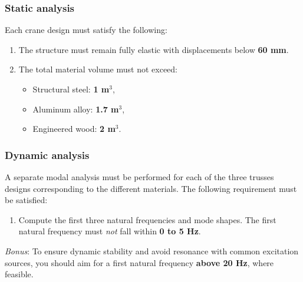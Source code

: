 \documentclass[12pt]{article}
\begin{document}
\subsubsection*{Static analysis}
Each crane design must satisfy the following:

\begin{enumerate}
  \item The structure must remain fully elastic with displacements below \textbf{60 mm}.
  \item The total material volume must not exceed:
        \begin{itemize}
          \item Structural steel: \textbf{1 m$^3$},
          \item Aluminum alloy: \textbf{1.7 m$^3$},
          \item Engineered wood: \textbf{2 m$^3$}.
        \end{itemize}
\end{enumerate}

\subsubsection*{Dynamic analysis}
A separate modal analysis must be performed for each of the three trusses designs corresponding to the different materials. The following requirement must be satisfied:
\begin{enumerate}
  \item[3.] Compute the first three natural frequencies and mode shapes. The first natural frequency must \emph{not} fall within \textbf{0 to 5 Hz}.
\end{enumerate}

\emph{Bonus}: To ensure dynamic stability and avoid resonance with common excitation sources, you should aim for a first natural frequency \textbf{above 20 Hz}, where feasible.
\end{document}
